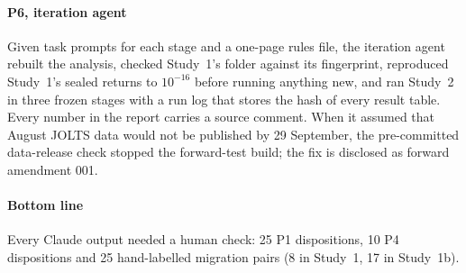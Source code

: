 \documentclass[11pt,letterpaper]{article}
\begin{document}
\paragraph{P6, iteration agent} Given task prompts for each stage and a one-page
rules file, the iteration agent rebuilt the analysis, checked Study~1's folder
against its fingerprint, reproduced Study~1's sealed returns to $10^{-16}$
before running anything new, and ran Study~2 in three frozen stages with a run
log that stores the hash of every result table. Every number in the report
carries a source comment. When it assumed that August JOLTS data would not be
published by 29 September, the pre-committed data-release check stopped the
forward-test build; the fix is disclosed as forward amendment 001.

\paragraph{Bottom line} Every Claude output needed a human check: 25 P1
dispositions, 10 P4 dispositions and 25 hand-labelled migration pairs (8 in
Study~1, 17 in Study~1b). %
\end{document}
